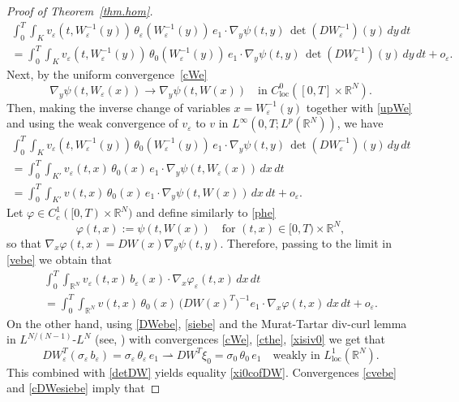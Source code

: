\documentclass[JEP,XML,SOM,Unicode]{cedram}
\newcommand{\loc}{\mathrm{loc}}
\newcommand{\spfrac}[2]{{#1}/{(#2)}}
\let \ph \varphi
\def \RR {\mathbb R}
\theoremstyle{plain}
\theoremstyle{definition}
\begin{document}
\begin{proof}[Proof of Theorem~\ref{thm.hom}]
\begin{multline*}
 \int_0^T\!\!\int_{K}v_\varepsilon(t,W_\varepsilon^{-1}(y))\,\theta_\varepsilon(W_\varepsilon^{-1}(y))\,e_1\cdot\nabla_y\psi(t,y)\,\det(DW_\varepsilon^{-1})(y)\,dy\,dt
\\
=\int_0^T\!\!\int_{K}v_\varepsilon(t,W_\varepsilon^{-1}(y))\,\theta_0(W_\varepsilon^{-1}(y))\,e_1\cdot\nabla_y\psi(t,y)\,\det(DW_\varepsilon^{-1})(y)\,dy\,dt+o_\varepsilon.
\end{multline*}
Next, by the uniform convergence~\eqref{cWe}
\[
\nabla_y\psi(t,W_\varepsilon(x))\to\nabla_y\psi(t,W(x))\quad\mbox{in }C^0_\loc([0,T]\times\RR^N).
\]
Then, making the inverse change of variables $x=W_\varepsilon^{-1}(y)$ together with \eqref{upWe} and using the weak convergence of $v_\varepsilon$ to $v$ in $L^\infty(0,T;L^p(\RR^N))$, we have
\begin{multline*}
 \int_0^T\!\!\int_{K}v_\varepsilon(t,W_\varepsilon^{-1}(y))\,\theta_0(W_\varepsilon^{-1}(y))\,e_1\cdot\nabla_y\psi(t,y)\,\det(DW_\varepsilon^{-1})(y)\,dy\,dt
\\
= \int_0^T\!\!\int_{K'}v_\varepsilon(t,x)\,\theta_0(x)\,e_1\cdot\nabla_y\psi(t,W_\varepsilon(x))\,dx\,dt
\\
=\int_0^T\!\!\int_{K'}v(t,x)\,\theta_0(x)\,e_1\cdot\nabla_y\psi(t,W(x))\,dx\,dt+o_\varepsilon.
\end{multline*}
Let $\ph\in C^1_c([0,T)\times\RR^N)$ and define similarly to \eqref{phe}
\[
\ph(t,x):=\psi(t, W(x))\quad\mbox{for }(t,x)\in[0,T)\times\RR^N,
\]
so that $\nabla_x\ph(t,x)=DW(x)\nabla_y\psi(t,y)$.
Therefore, passing to the limit in \eqref{vebe} we obtain that
\begin{multline}\label{cvebe}
\int_0^T\!\!\int_{\RR^N}v_\varepsilon(t,x)\,b_\varepsilon(x)\cdot\nabla_x\ph_\varepsilon(t,x)\,dx\,dt
\\
=\int_0^T\!\!\int_{\RR^N}v(t,x)\,\theta_0(x)\,\big(DW(x)^T\big)^{-1}e_1\cdot\nabla_x\ph(t,x)\,dx\,dt+o_\varepsilon.
\end{multline}
On the other hand, using \eqref{DWebe}, \eqref{siebe} and the Murat-Tartar div-curl lemma in $L^{\spfrac{N}{N-1}}$-$L^N$ (see, \eg \cite[Th.\,2]{Mur}) with convergences \eqref{cWe}, \eqref{cthe}, \eqref{xisiv0} we get that
\begin{equation}\label{cDWesiebe}
DW_\varepsilon^T(\sigma_\varepsilon\,b_\varepsilon)=\sigma_\varepsilon\,\theta_\varepsilon\,e_1\rightharpoonup DW^T\xi_0=\sigma_0\,\theta_0\,e_1\quad\mbox{weakly in }L^1_\loc(\RR^N).
\end{equation}
This combined with \eqref{detDW} yields equality \eqref{xi0cofDW}.
Convergences \eqref{cvebe} and \eqref{cDWesiebe} imply that

\end{proof}
\end{document}
